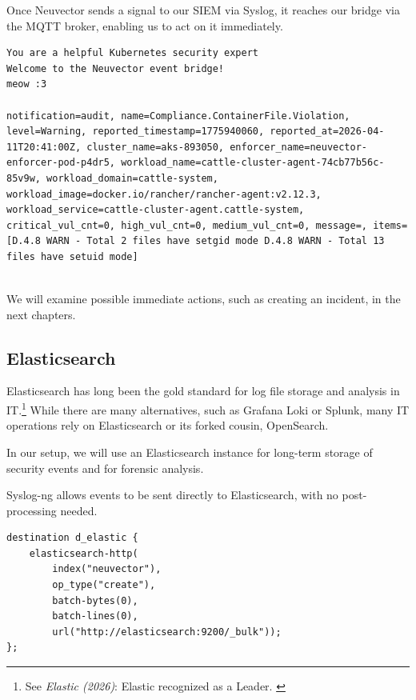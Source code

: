Once Neuvector sends a signal to our SIEM via Syslog, it reaches our bridge via the MQTT broker, enabling us to act on it immediately.

\begin{lstlisting}[caption=Event Bridge Log, frame=single, basicstyle=\ttfamily, breaklines=true]
You are a helpful Kubernetes security expert
Welcome to the Neuvector event bridge!
meow :3

notification=audit, name=Compliance.ContainerFile.Violation, level=Warning, reported_timestamp=1775940060, reported_at=2026-04-11T20:41:00Z, cluster_name=aks-893050, enforcer_name=neuvector-enforcer-pod-p4dr5, workload_name=cattle-cluster-agent-74cb77b56c-85v9w, workload_domain=cattle-system, workload_image=docker.io/rancher/rancher-agent:v2.12.3, workload_service=cattle-cluster-agent.cattle-system, critical_vul_cnt=0, high_vul_cnt=0, medium_vul_cnt=0, message=, items=[D.4.8 WARN - Total 2 files have setgid mode D.4.8 WARN - Total 13 files have setuid mode]
 
\end{lstlisting}

We will examine possible immediate actions, such as creating an incident, in the next chapters.

\subsection{Elasticsearch}

Elasticsearch has long been the gold standard for log file storage and analysis in IT.\footnote{See \textit{Elastic (2026)}: Elastic recognized as a Leader. \cite{gartnerElastic}} While there are many alternatives, such as Grafana Loki or Splunk, many IT operations rely on Elasticsearch or its forked cousin, OpenSearch.

In our setup, we will use an Elasticsearch instance for long-term storage of security events and for forensic analysis.

Syslog-ng allows events to be sent directly to Elasticsearch, with no post-processing needed.

\pagebreak
\begin{lstlisting}[caption=Destination d-elastic, frame=single, basicstyle=\ttfamily\small, breaklines=true]
destination d_elastic {
    elasticsearch-http(
        index("neuvector"),
        op_type("create"),
        batch-bytes(0),
        batch-lines(0),
        url("http://elasticsearch:9200/_bulk"));
};

\end{lstlisting}

